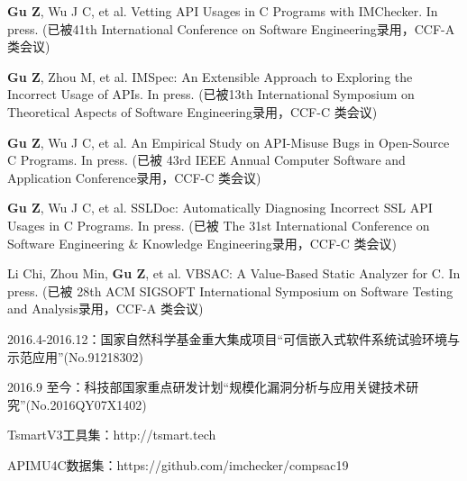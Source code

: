 \begin{resume}
  \begin{publications}[before=\publicationskip,after=\publicationskip]
    \item \textbf{Gu Z}, Wu J C, et al. Vetting API Usages in C Programs with IMChecker. In press. (已被41th International Conference on Software Engineering录用，CCF-A 类会议)
    \item \textbf{Gu Z}, Zhou M, et al. IMSpec: An Extensible Approach to Exploring the Incorrect Usage of APIs. In press. (已被13th International Symposium on Theoretical Aspects of Software Engineering录用，CCF-C 类会议)
    \item \textbf{Gu Z}, Wu J C, et al. An Empirical Study on API-Misuse Bugs in Open-Source C Programs. In press. (已被 43rd IEEE Annual Computer Software and Application Conference录用，CCF-C 类会议)
    \item \textbf{Gu Z}, Wu J C, et al. SSLDoc: Automatically Diagnosing Incorrect SSL API Usages in C Programs. In press. (已被 The 31st International Conference on Software Engineering \& Knowledge Engineering录用，CCF-C 类会议)
    \item Li Chi, Zhou Min, \textbf{Gu Z}, et al. VBSAC: A Value-Based Static Analyzer for C. In press. (已被 28th ACM SIGSOFT International Symposium on Software Testing and Analysis录用，CCF-A 类会议)
  \end{publications}


  \begin{achievements}
  	\item 2016.4-2016.12：国家自然科学基金重大集成项目“可信嵌入式软件系统试验环境与示范应用”(No.91218302)
  	\item 2016.9 至今：科技部国家重点研发计划“规模化漏洞分析与应用关键技术研究”(No.2016QY07X1402)
  	
  	
  \end{achievements}

  \begin{achievements}
    \item TsmartV3工具集：http://tsmart.tech
    \item APIMU4C数据集：https://github.com/imchecker/compsac19
  \end{achievements}

\end{resume}
